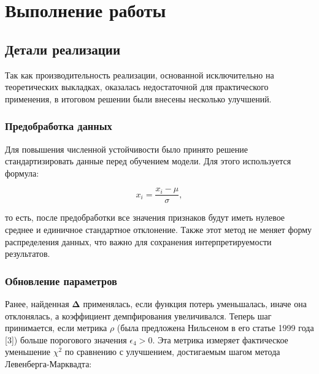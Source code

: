 


\newcommand{\subject}{Дифференциальные уравнения}
\newcommand{\theme}{Аппроксимация данных линейной комбинацией экспоненциальных функций}
\newcommand{\teacher}{Колоницкий С.Б.}
\newcommand{\student}{Поглазов Н.В.}
\newcommand{\groupnumber}{2384}
\newcommand{\group}{Группа 2384}





\setcounter{page}{2}



\section{Выполнение работы}
\subsection{Детали реализации}

Так как производительность реализации, основанной исключительно на теоретических выкладках, оказалась недостаточной для практического применения, в итоговом решении были внесены несколько улучшений.

\subsubsection{Предобработка данных}

Для повышения численной устойчивости было принято решение стандартизировать данные перед обучением модели. Для этого используется формула:

\[
	x_i = \frac{x_i - \mu}{\sigma},
\]

то есть, после предобработки все значения признаков будут иметь нулевое среднее и единичное стандартное отклонение. Также этот метод не меняет форму распределения данных, что важно для сохранения интерпретируемости результатов.

\subsubsection{Обновление параметров}

Ранее, найденная $\boldsymbol{\Delta}$ применялась, если функция потерь уменьшалась, иначе она отклонялась, а коэффициент демпфирования увеличивался. Теперь шаг принимается, если метрика $\rho$ (была предложена Нильсеном в его статье 1999 года [3]) больше порогового значения $\epsilon_4 > 0$. Эта метрика измеряет фактическое уменьшение $\chi^2$ по сравнению с улучшением, достигаемым шагом метода Левенберга-Марквадта:

